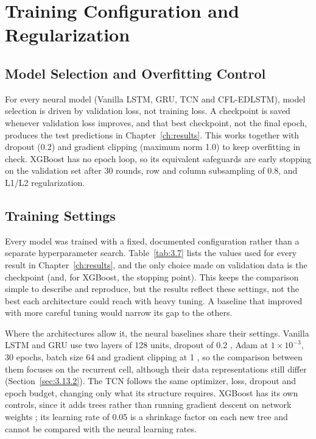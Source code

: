 \section{Training Configuration and Regularization}
\label{sec:3.14}

\subsection{Model Selection and Overfitting Control}
\label{sec:3.14.1}

For every neural model (Vanilla LSTM, GRU, TCN and CFL-EDLSTM), model selection
is driven by validation loss, not training loss. A checkpoint is saved whenever
validation loss improves, and that best checkpoint, not the final epoch,
produces the test predictions in Chapter~\ref{ch:results}. This works together
with dropout (0.2) and gradient clipping (maximum norm 1.0) to keep overfitting
in check. XGBoost has no epoch loop, so its equivalent safeguards are early
stopping on the validation set after 30 rounds, row and column subsampling of
0.8, and L1/L2 regularization.

\subsection{Training Settings}
\label{sec:3.14.2}

Every model was trained with a fixed, documented configuration rather than a
separate hyperparameter search. Table~\ref{tab:3.7} lists the values used for
every result in Chapter~\ref{ch:results}, and the only choice made on validation
data is the checkpoint (and, for XGBoost, the stopping point). This keeps the
comparison simple to describe and reproduce, but the results reflect these
settings, not the best each architecture could reach with heavy tuning. A
baseline that improved with more careful tuning would narrow its gap to the
others.

Where the architectures allow it, the neural baselines share their settings.
Vanilla LSTM and GRU use two layers of 128 units, dropout of 0.2
\cite{Srivastava2014}, Adam \cite{Kingma2015} at $1\times10^{-3}$, 30 epochs,
batch size 64 and gradient clipping at 1 \cite{Pascanu2013}, so the comparison
between them focuses on the recurrent cell, although their data representations
still differ (Section~\ref{sec:3.13.2}). The TCN follows the same optimizer,
loss, dropout and epoch budget, changing only what its structure requires.
XGBoost has its own controls, since it adds trees rather than running gradient
descent on network weights \cite{ChenGuestrin2016}; its learning rate of 0.05 is
a shrinkage factor on each new tree and cannot be compared with the neural
learning rates.

